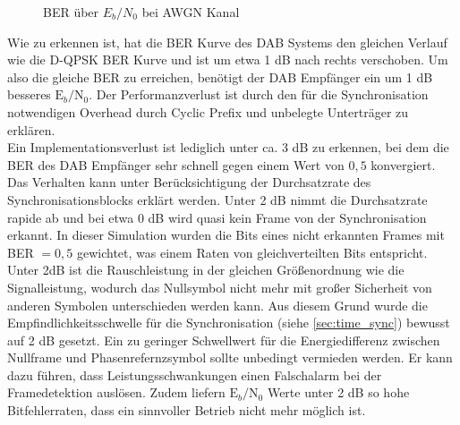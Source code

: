 \begin{figure}[htb]
\begin{center}
\end{center}
\caption{BER über $E_b/N_0$ bei AWGN Kanal}
\label{plot:awgn_ber}
\end{figure}

Wie zu erkennen ist, hat die BER Kurve des DAB Systems den gleichen Verlauf wie die D-QPSK BER Kurve und ist um etwa 1 dB nach rechts verschoben. Um also die gleiche BER zu erreichen, benötigt der DAB Empfänger ein um 1 dB besseres $\text{E}_b/\text{N}_0$. Der Performanzverlust ist durch den für die Synchronisation notwendigen Overhead durch Cyclic Prefix und unbelegte Unterträger zu erklären.\\
Ein Implementationsverlust ist lediglich unter ca. 3 dB zu erkennen, bei dem die BER des DAB Empfänger sehr schnell gegen einem Wert von $0,5$ konvergiert. Das Verhalten kann unter Berücksichtigung der Durchsatzrate des Synchronisationsblocks erklärt werden. Unter 2 dB nimmt die Durchsatzrate rapide ab und bei etwa 0 dB wird quasi kein Frame von der Synchronisation erkannt. In dieser Simulation wurden die Bits eines nicht erkannten Frames mit BER $= 0,5$ gewichtet, was einem Raten von gleichverteilten Bits entspricht. Unter 2dB ist die Rauschleistung in der gleichen Größenordnung wie die Signalleistung, wodurch das Nullsymbol nicht mehr mit großer Sicherheit von anderen Symbolen unterschieden werden kann. Aus diesem Grund wurde die Empfindlichkeitsschwelle für die Synchronisation (siehe \ref{sec:time_sync}) bewusst auf 2 dB gesetzt. Ein zu geringer Schwellwert für die Energiedifferenz zwischen Nullframe und Phasenrefernzsymbol sollte unbedingt vermieden werden. Er kann dazu führen, dass Leistungsschwankungen einen Falschalarm bei der Framedetektion auslösen. Zudem liefern $\text{E}_b/\text{N}_0$ Werte unter 2 dB so hohe Bitfehlerraten, dass ein sinnvoller Betrieb nicht mehr möglich ist.


